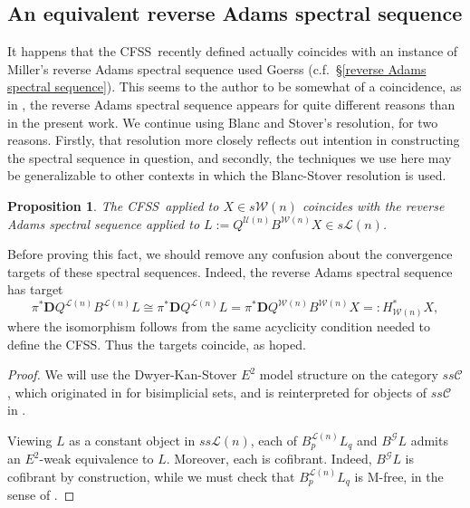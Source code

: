 \documentclass[11pt]{amsart} \renewcommand{\baselinestretch}{1.2}
\theoremstyle{plain}
\newtheorem{prop}[thm]{Proposition}
\numberwithin{equation}{section} %
\theoremstyle{plain}
\newtheorem{prop}[thm]{Proposition}
\numberwithin{equation}{chapter} %
\newcommand{\scrG}{\mathscr{G}}
\newcommand{\calU}{\mathcal{U}}
\newcommand{\calL}{\mathcal{L}}
\newcommand{\calw}{\mathcal{W}}
\newcommand{\calc}{\mathcal{C}}
\newcommand{\citeBOX}[2][]{\cite[\mbox{#1}]{#2}}
\newcommand{\BSW}{{\scrG}}
\newcommand{\dual}{\mathbf{D}}
\newcommand{\CFSS}{CFSS}
\newcommand{\SubsectionOrSection}[1]{\subsection{#1}}
\begin{document}
\begin{Comp funct sseqs}
\SubsectionOrSection{An equivalent reverse Adams spectral sequence}
It happens that the \CFSS\ recently defined actually coincides with an instance of Miller's reverse Adams spectral sequence used Goerss   \cite[Chapter V]{MR1089001} (c.f.\ \S\ref{reverse Adams spectral sequence}). This seems to the author to be somewhat of a coincidence, as in \cite{MR1089001}, the reverse Adams spectral sequence appears for quite different reasons than in the present work.
We continue using Blanc and Stover's resolution, for two reasons. Firstly, that resolution more closely reflects out intention in constructing the spectral sequence in question, and secondly, the techniques we use here may be generalizable to other contexts in which the Blanc-Stover resolution is used.

\begin{prop}
The \CFSS\ applied to $X\in s\calw(n)$ coincides with the reverse Adams spectral sequence applied to  $L:=Q^{\calU(n)}{ B^{\calw(n)}X}\in s\calL(n)$.
\end{prop}
\noindent Before proving this fact, we should remove any confusion about the convergence targets of these spectral sequences. Indeed, the reverse Adams  spectral sequence has target
\[\pi^*\dual Q^{\calL(n)}B^{\calL(n)}L\cong \pi^*\dual Q^{\calL(n)}L=\pi^*\dual Q^{\calw(n)}B^{\calw(n)}X=:H^*_{\calw(n)}X,\]
where the isomorphism follows from the same acyclicity condition needed to define the \CFSS. Thus the targets coincide, as hoped.
\begin{proof}
We will use the Dwyer-Kan-Stover $E^2$ model structure on the category $ss\calc$, which originated in \cite{DKS.pdf} for bisimplicial sets, and is reinterpreted for objects of $ss\calc$ in \citeBOX[\S4.1.1]{Blanc_Stover-Groth_SS.pdf}.

Viewing $L$ as a constant object in $ss\calL(n)$, each of $B^{\calL(n)}_pL_q$ and $B^{\BSW}L$ admits an $E^2$-weak equivalence to $L$. Moreover, each  is cofibrant. Indeed, $B^{\BSW}L$ is cofibrant by construction, while we must check  that  $B^{\calL(n)}_pL_q$ is M-free, in the sense of \citeBOX[\S4.1.1]{Blanc_Stover-Groth_SS.pdf}.


\end{proof}
\end{Comp funct sseqs}
\end{document}
